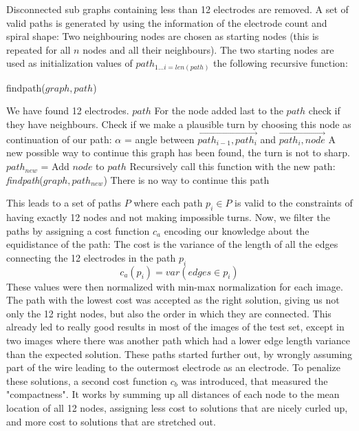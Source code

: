 \documentclass[a4paper, 11pt]{article}
\begin{document}
Disconnected sub graphs containing less than 12 electrodes are removed.
A set of valid paths is generated by using the information of the electrode count and spiral shape: Two neighbouring nodes are chosen as starting nodes (this is repeated for all $n$ nodes and all their neighbours). The two starting nodes are used as initialization values of $path_{1...i = len(path)} $ the following recursive function:

\begin{algorithm}[H]
	\caption{findpath($graph,path$)} 
	
	\begin{algorithmic}[1]
			 \State We have found 12 electrodes.
		\Return $path$
		\EndIf
		\State For the node added last to the $path$ check if they have neighbours.
				\State Check if we make a plausible turn by choosing this node as continuation of our path:
				\State $\alpha$ = angle between $\overrightarrow{path_{i-1}, path_i}$ and $\overrightarrow{path_i, node}$
					\State A new possible way to continue this graph has been found, the turn is not to sharp.
					\State $path_{new}$ = Add $node$ to $path$
					\State Recursively call this function with the new path:
					\State \emph{findpath}($graph,path_{new}$)
				\EndIf
		\EndFor
			\State There is no way to continue this path
			\Return
		\EndIf
		
	\end{algorithmic} 
\end{algorithm}

This leads to a set of paths $P$ where each path $p_i \in P$ is valid to the constraints of having exactly 12 nodes and not making impossible turns. Now, we filter the paths by assigning a cost function $c_a$ encoding our knowledge about the equidistance of the path: The cost is the variance of the length of all the edges connecting the 12 electrodes in the path $p_i$
$$ c_a(p_i)=var(edges\in p_i)$$
These values were then normalized with min-max normalization for each image. The path with the lowest cost was accepted as the right solution, giving us not only the 12 right nodes, but also the order in which they are connected.
This already led to really good results in most of the images of the test set, except in two images where there was another path which had a lower edge length variance than the expected solution. These paths started further out, by wrongly assuming part of the wire leading to the outermost electrode as an electrode. To penalize these solutions, a second cost function $c_b$ was introduced, that measured the "compactness". It works by summing up all distances of each node to the mean location of all 12 nodes, assigning less cost to solutions that are nicely curled up, and more cost to solutions that are stretched out. 
\end{document}
